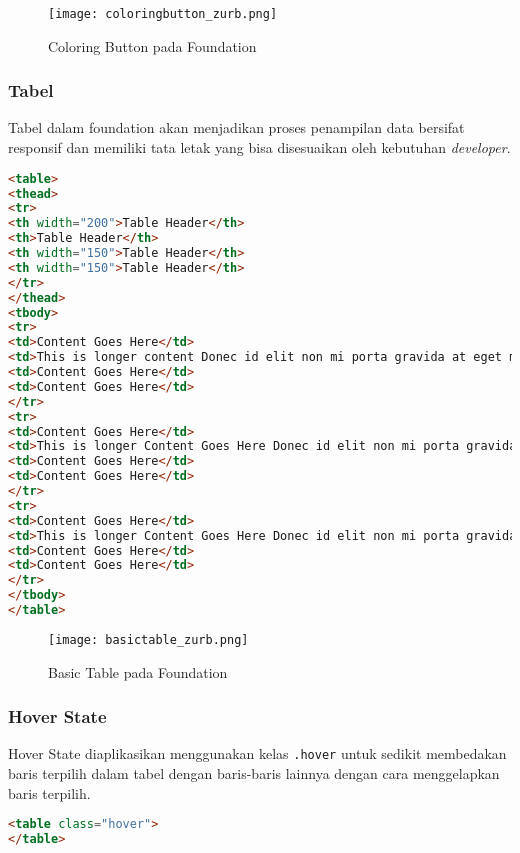 \begin{figure} [H]
	\centering  
	\texttt{[image: coloringbutton\_zurb.png]}  
	\caption{Coloring Button pada Foundation}
	\label{fig:colorButtonFoundation}
\end{figure}

\subsubsection{Tabel}

Tabel dalam foundation akan menjadikan proses penampilan data bersifat responsif dan memiliki tata letak yang bisa disesuaikan oleh kebutuhan \textit{developer}.


\begin{lstlisting}[language=HTML,  basicstyle=\ttfamily, frame=single, columns=fullflexible, keepspaces=true, breaklines=true, showstringspaces=false, label={lst:tabelFoundation}, caption=Tabel pada foundation 6.]  
<table>
<thead>
<tr>
<th width="200">Table Header</th>
<th>Table Header</th>
<th width="150">Table Header</th>
<th width="150">Table Header</th>
</tr>
</thead>
<tbody>
<tr>
<td>Content Goes Here</td>
<td>This is longer content Donec id elit non mi porta gravida at eget metus.</td>
<td>Content Goes Here</td>
<td>Content Goes Here</td>
</tr>
<tr>
<td>Content Goes Here</td>
<td>This is longer Content Goes Here Donec id elit non mi porta gravida at eget metus.</td>
<td>Content Goes Here</td>
<td>Content Goes Here</td>
</tr>
<tr>
<td>Content Goes Here</td>
<td>This is longer Content Goes Here Donec id elit non mi porta gravida at eget metus.</td>
<td>Content Goes Here</td>
<td>Content Goes Here</td>
</tr>
</tbody>
</table>
\end{lstlisting}

\begin{figure} [H]
	\centering  
	\texttt{[image: basictable\_zurb.png]}  
	\caption{Basic Table pada Foundation}
	\label{fig:tableFoundation}
\end{figure}

\subsubsection{Hover State}
Hover State diaplikasikan menggunakan kelas \texttt{.hover} untuk sedikit membedakan baris terpilih dalam tabel dengan baris-baris lainnya dengan cara menggelapkan baris terpilih.
\begin{lstlisting}[language=HTML,  basicstyle=\ttfamily, frame=single, columns=fullflexible, keepspaces=true, breaklines=true, showstringspaces=false, label={lst:hoverstateFoundation}, caption=Hover State pada foundation 6.] 
<table class="hover">
</table>
\end{lstlisting}

